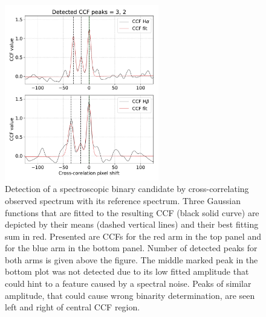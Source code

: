 \begin{figure}
	\centering
	\includegraphics[width=0.6\textwidth]{paper_140812003801021_3.pdf}
	\caption{Detection of a spectroscopic binary candidate by cross-correlating observed spectrum with its reference spectrum. Three Gaussian functions that are fitted to the resulting CCF (black solid curve) are depicted by their means (dashed vertical lines) and their best fitting sum in red. Presented are CCFs for the red arm in the top panel and for the blue arm in the bottom panel. Number of detected peaks for both arms is given above the figure. The middle marked peak in the bottom plot was not detected due to its low fitted amplitude that could hint to a feature caused by a spectral noise. Peaks of similar amplitude, that could cause wrong binarity determination, are seen left and right of central CCF region.}
	\label{fig:sb2ccf}
\end{figure}

